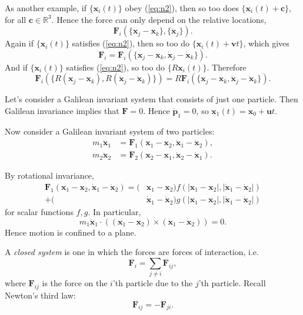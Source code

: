 \documentclass[12pt]{article}
\begin{document}
As another example, if $\{\mathbf{x}_i(t)\}$ obey (\ref{eq:n2}), then so too does $\{\mathbf{x}_i(t) + \mathbf{c}\}$, for all $\mathbf{c} \in \mathbb{R}^3$. Hence the force can only depend on the relative locations,
\[
	\mathbf{F}_i(\{\mathbf{x}_j - \mathbf{x}_k\}, \{\mathbf{\dot x}_j\}).
\]
Again if $\{\mathbf{x}_i(t)\}$ satisfies (\ref{eq:n2}), then so too do $\{\mathbf{x}_i(t) + \mathbf{v} t\}$, which gives
\[
	\mathbf{F}_i = \mathbf{F}_i(\{\mathbf{x}_j - \mathbf{x}_k, \mathbf{\dot x}_j - \mathbf{\dot x}_k\}).
\]
And if $\{\mathbf{x}_i(t)\}$ satisfies (\ref{eq:n2}), so too do $\{R \mathbf{x}_i(t)\}$. Therefore
\[
	\mathbf{F}_i(\{R(\mathbf{x}_j - \mathbf{x}_k), R(\mathbf{\dot x}_j - \mathbf{\dot x}_k)\}) = R \mathbf{F}_i(\{\mathbf{x}_j - \mathbf{x}_k, \mathbf{\dot x}_j - \mathbf{\dot x}_k\}).
\]

Let's consider a Galilean invariant system that consists of just one particle. Then Galilean invariance implies that $\mathbf{F} = 0$. Hence $\mathbf{\dot p}_1 = 0$, so $\mathbf{x}_1(t) = \mathbf{x}_0 + \mathbf{u}t$.

Now consider a Galilean invariant system of two particles:
\begin{align*}
	m_1 \mathbf{\ddot x}_1 &= \mathbf{F}_1 (\mathbf{x}_1 - \mathbf{x}_2, \mathbf{\dot x}_1 - \mathbf{\dot x}_2),\\
	m_2 \mathbf{\ddot x}_2 &= \mathbf{F}_2(\mathbf{x}_2 - \mathbf{x}_1, \mathbf{\dot x}_2 - \mathbf{\dot x}_1).
\end{align*}

By rotational invariance,
\begin{align*}
	\mathbf{F}_1(\mathbf{x}_1 - \mathbf{x}_2, \mathbf{\dot x}_1 - \mathbf{\dot x}_2) = (&\mathbf{x}_1 - \mathbf{x}_2) f(|\mathbf{x}_1 - \mathbf{x}_2|, |\mathbf{\dot x}_1 - \mathbf{\dot x}_2|) \\
	+ (&\mathbf{\dot x}_1 - \mathbf{\dot x}_2)g(|\mathbf{x}_1 - \mathbf{x}_2|, |\mathbf{\dot x}_1 - \mathbf{\dot x}_2|)
\end{align*}
for scalar functions $f, g$. In particular,
\[
m_1 \mathbf{\ddot x}_1 \cdot ((\mathbf{x}_1 - \mathbf{x}_2) \times (\mathbf{\dot x}_1 - \mathbf{\dot x}_2)) = 0.
\]
Hence motion is confined to a plane.

A \emph{closed system} is one in which the forces are forces of interaction, i.e.
\[
\mathbf{F}_i = \sum_{j \neq i} \mathbf{F}_{ij},
\]
where $\mathbf{F}_{ij}$ is the force on the $i$'th particle due to the $j$'th particle. Recall Newton's third law:
\[
	\mathbf{F}_{ij} = - \mathbf{F}_{ji}. \tag{N3}\label{eq:n3}
\]
\end{document}
